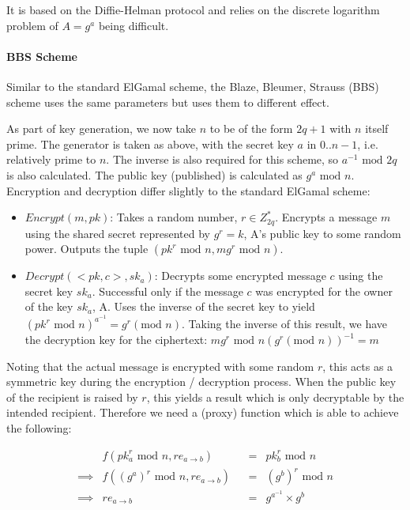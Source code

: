 It is based on the Diffie-Helman protocol and relies on the discrete logarithm problem of $A = g^a$ being difficult.

\paragraph{BBS Scheme}

Similar to the standard ElGamal scheme, the Blaze, Bleumer, Strauss (BBS) scheme uses the same parameters but uses them to different effect.

As part of key generation, we now take $n$ to be of the form $2q + 1$ with $n$ itself prime. The generator is taken as above, with the secret key $a$ in ${0..n - 1}$, i.e. relatively prime to $n$. The inverse is also required for this scheme, so $a^{-1} \text{ mod } 2q$ is also calculated. The public key (published) is calculated as $g^a \text{ mod } n$. Encryption and decryption differ slightly to the standard ElGamal scheme:

\begin{itemize}
  \item $Encrypt(m, pk)$: Takes a random number, $r \in Z_{2q}^*$. Encrypts a message $m$ using the shared secret represented by $g^r = k$, A's public key to some random power. Outputs the tuple $(pk^r \text{ mod } n, mg^r \text{ mod } n)$.
  \item $Decrypt(<pk, c>, sk_a)$: Decrypts some encrypted message $c$ using the secret key $sk_a$. Successful only if the message $c$ was encrypted for the owner of the key $sk_a$, A. Uses the inverse of the secret key to yield $(pk^r \text{ mod } n)^{a^{-1}} = g^r (\text{mod } n)$. Taking the inverse of this result, we have the decryption key for the ciphertext: $mg^r \text{ mod } n(g^r (\text{mod } n))^{-1} = m$
\end{itemize}

Noting that the actual message is encrypted with some random $r$, this acts as a symmetric key during the encryption / decryption process. When the public key of the recipient is raised by $r$, this yields a result which is only decryptable by the intended recipient. Therefore we need a (proxy) function which is able to achieve the following:

$$
\begin{aligned}
& f(pk_a^r \text{ mod } n, re_{a \rightarrow b}) & &=& pk_b^r \text{ mod } n \\
\implies & f((g^a)^r \text{ mod } n, re_{a \rightarrow b}) & &=& (g^b)^r \text{ mod } n \\
\implies & re_{a \rightarrow b} & &=& g^{a^{-1}} \times g^{b}
\end{aligned}
$$

